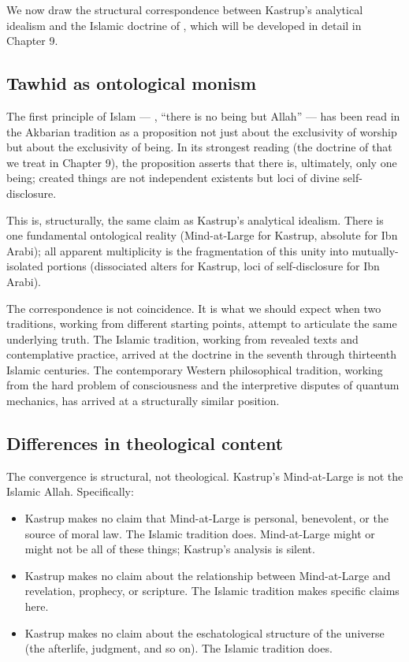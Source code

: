 We now draw the structural correspondence between Kastrup's
analytical idealism and the Islamic doctrine of , which
will be developed in detail in Chapter 9.

\subsection{Tawhid as ontological monism}

The first principle of Islam --- , ``there
is no being but Allah'' --- has been read in the Akbarian tradition
as a proposition not just about the exclusivity of worship but about
the exclusivity of being. In its strongest reading (the doctrine of
 that we treat in Chapter 9), the proposition
asserts that there is, ultimately, only one being; created things
are not independent existents but loci of divine self-disclosure.

This is, structurally, the same claim as Kastrup's analytical
idealism. There is one fundamental ontological reality
(Mind-at-Large for Kastrup, absolute  for Ibn Arabi);
all apparent multiplicity is the fragmentation of this unity into
mutually-isolated portions (dissociated alters for Kastrup, loci
of self-disclosure for Ibn Arabi).

The correspondence is not coincidence. It is what we should expect
when two traditions, working from different starting points,
attempt to articulate the same underlying truth. The Islamic
tradition, working from revealed texts and contemplative practice,
arrived at the doctrine in the seventh through thirteenth Islamic
centuries. The contemporary Western philosophical tradition, working
from the hard problem of consciousness and the interpretive disputes
of quantum mechanics, has arrived at a structurally similar
position.

\subsection{Differences in theological content}

The convergence is structural, not theological. Kastrup's
Mind-at-Large is not the Islamic Allah. Specifically:

\begin{itemize}[leftmargin=2em]
    \item Kastrup makes no claim that Mind-at-Large is personal,
    benevolent, or the source of moral law. The Islamic tradition
    does. Mind-at-Large might or might not be all of these things;
    Kastrup's analysis is silent.
    \item Kastrup makes no claim about the relationship between
    Mind-at-Large and revelation, prophecy, or scripture. The
    Islamic tradition makes specific claims here.
    \item Kastrup makes no claim about the eschatological structure
    of the universe (the afterlife, judgment, and so on). The
    Islamic tradition does.
\end{itemize}

